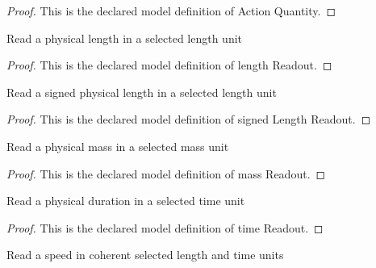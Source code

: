\begin{proof}
  This is the declared model definition of Action Quantity.
\end{proof}
\begin{definition}
  \label{def:physics:phyx-mini-0507:phyxminiproblems-problemphyxmini0507-lengthreadout}
  Read a physical length in a selected length unit
\end{definition}
\begin{proof}
  This is the declared model definition of length Readout.
\end{proof}
\begin{definition}
  \label{def:physics:phyx-mini-0507:phyxminiproblems-problemphyxmini0507-signedlengthreadout}
  Read a signed physical length in a selected length unit
\end{definition}
\begin{proof}
  This is the declared model definition of signed Length Readout.
\end{proof}
\begin{definition}
  \label{def:physics:phyx-mini-0507:phyxminiproblems-problemphyxmini0507-massreadout}
  Read a physical mass in a selected mass unit
\end{definition}
\begin{proof}
  This is the declared model definition of mass Readout.
\end{proof}
\begin{definition}
  \label{def:physics:phyx-mini-0507:phyxminiproblems-problemphyxmini0507-timereadout}
  Read a physical duration in a selected time unit
\end{definition}
\begin{proof}
  This is the declared model definition of time Readout.
\end{proof}
\begin{definition}
  \label{def:physics:phyx-mini-0507:phyxminiproblems-problemphyxmini0507-speedreadout}
  Read a speed in coherent selected length and time units
\end{definition}
